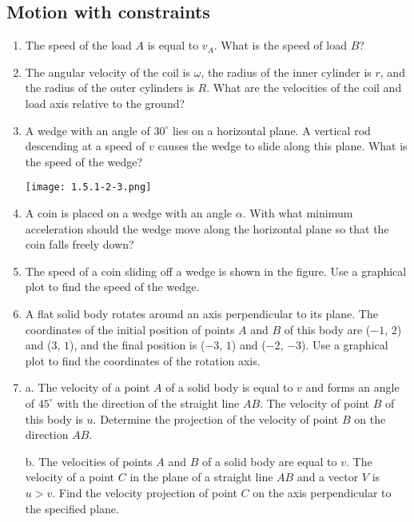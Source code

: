 \documentclass{article}
\begin{document}
\subsection{Motion with constraints}

\begin{enumerate}[label=1.5.\arabic*]
 
 
\item The speed of the load $A$ is equal to $v_A$. What is the speed of load $B$?

\item The angular velocity of the coil is $\omega$, the radius of the inner cylinder is $r$, and the radius of the outer cylinders is $R$. What are the velocities of the coil and load axis relative to the ground?

\item A wedge with an angle of $30^\circ$ lies on a horizontal plane. A vertical rod descending at a speed of $v$ causes the wedge to slide along this plane. What is the speed of the wedge?

\begin{center}
    \texttt{[image: 1.5.1-2-3.png]}
\end{center}

\item A coin is placed on a wedge with an angle $\alpha$. With what minimum acceleration should the wedge move along the horizontal plane so that the coin falls freely down?

\item The speed of a coin sliding off a wedge is shown in the figure. Use a graphical plot to find the speed of the wedge.

\item A flat solid body rotates around an axis perpendicular to its plane. The coordinates of the initial position of points $A$ and $B$ of this body are ($-1$, $2$) and ($3$, $1$), and the final position is ($-3$, $1$) and ($-2$, $-3$). Use a graphical plot to find the coordinates of the rotation axis.

\item a. The velocity of a point $A$ of a solid body is equal to $v$ and forms an angle of $45^\circ$ with the direction of the straight line $AB$. The velocity of point $B$ of this body is $u$. Determine the projection of the velocity of point $B$ on the direction $AB$.

b. The velocities of points $A$ and $B$ of a solid body are equal to $v$. The velocity of a point $C$ in the plane of a straight line $AB$ and a vector $V$ is $u > v$. Find the velocity projection of point $C$ on the axis perpendicular to the specified plane.


\end{enumerate}
\end{document}
